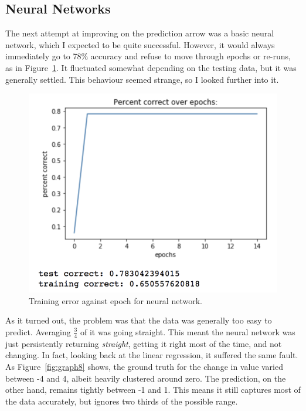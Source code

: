 \subsection{Neural Networks}
The next attempt at improving on the prediction arrow was a basic neural network, which I expected to be quite successful. However, it would always immediately go to 78\% accuracy and refuse to move through epochs or re-runs, as in Figure~\ref{fig:graph7}. It fluctuated somewhat depending on the testing data, but it was generally settled. This behaviour seemed strange, so I looked further into it.

\begin{figure}[ht]
\centering\includegraphics[width=1.0\linewidth]{images/graph7.png}
\caption{Training error against epoch for neural network.}
\label{fig:graph7}
\end{figure}

As it turned out, the problem was that the data was generally too easy to predict. Averaging $\frac{3}{4}$ of it was going straight. This meant the neural network was just persistently returning \textit{straight}, getting it right most of the time, and not changing. In fact, looking back at the linear regression, it suffered the same fault. As Figure~\ref{fig:graph8} shows, the ground truth for the change in value varied between -4 and 4, albeit heavily clustered around zero. The prediction, on the other hand, remains tightly between -1 and 1. This means it still captures most of the data accurately, but ignores two thirds of the possible range.

